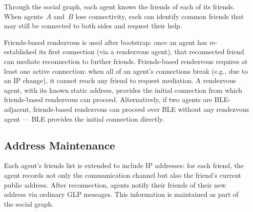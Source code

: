 Through the social graph, each agent knows the friends of each of its friends.  When agents~$A$ and~$B$ lose connectivity, each can identify common friends that may still be connected to both sides and request their help.

Friends-based rendezvous is used after bootstrap: once an agent has re-established its first connection (via a rendezvous agent), that reconnected friend can mediate reconnection to further friends.  Friends-based rendezvous requires at least one active connection: when all of an agent's connections break (e.g., due to an IP change), it cannot reach any friend to request mediation.  A rendezvous agent, with its known static address, provides the initial connection from which friends-based rendezvous can proceed.  Alternatively, if two agents are BLE-adjacent, friends-based rendezvous can proceed over BLE without any rendezvous agent --- BLE provides the initial connection directly.



\subsection{Address Maintenance}
\label{sec:addr-maintenance}
Each agent's friends list is extended to include IP addresses: for each friend, the agent records not only the communication channel but also the friend's current public address.  After reconnection, agents notify their friends of their new address via ordinary GLP messages.  This information is maintained as part of the social graph.




